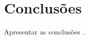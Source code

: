 \documentclass[12pt]{article}
\begin{document}
\section{Conclusões}

Apresentar as conclusões  \cite{dzwinel:04}.




\end{document}
